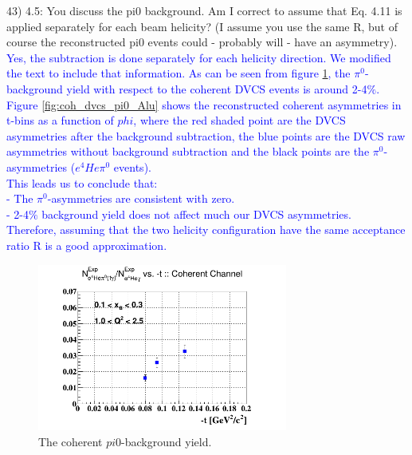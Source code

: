 43) 4.5: You discuss the pi0 background. Am I correct to assume that Eq. 4.11 
is applied separately for each beam helicity? (I assume you use the same R, but 
of course the reconstructed pi0 events could - probably will - have an 
asymmetry).   \\
\textcolor{blue}{ Yes, the subtraction is done separately for each helicity 
   direction. We modified the text to include that information. As can be seen 
   from figure \ref{fig:pi0yield}, the $\pi^0$-background yield with respect to 
   the coherent DVCS events is around 2-4$\%$.}\\
   \textcolor{blue}{
   Figure \ref{fig:coh_dvcs_pi0_Alu} shows the reconstructed coherent 
   asymmetries in t-bins as a function of $phi$, where the red shaded point are 
   the DVCS asymmetries after the background subtraction, the blue points are 
   the DVCS raw asymmetries without background subtraction and the black points 
   are the $\pi^0$-asymmetries ($e^{4}He\pi^{0}$ events).  }\\
\textcolor{blue}{This leads us to conclude that:\\
- The  $\pi^{0}$-asymmetries are consistent with zero.\\
- 2-4$\%$ background yield does not affect much our DVCS asymmetries.\\
Therefore, assuming that the two helicity configuration have the same 
acceptance ratio R is a good approximation.}\\

\begin{figure}[tbp]
   \centering
   \includegraphics[height=5.5cm]{fig/t_ratio_coh_t.png}
   \caption{The coherent $pi0$-background yield.}
   \label{fig:pi0yield}
\end{figure}
                          
